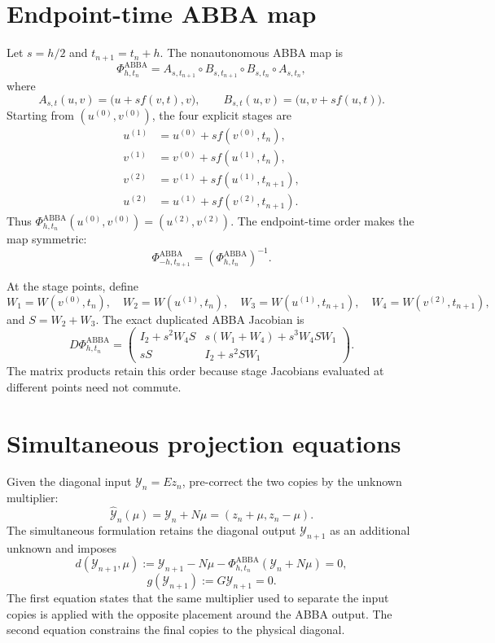 \documentclass[11pt,a4paper]{article}
\newcommand{\Id}{I}
\newcommand{\Y}{\mathcal{Y}}
\newcommand{\PhiAB}{\Phi^{\mathrm{ABBA}}_{h,t_n}}
\begin{document}
\section{Endpoint-time ABBA map}

Let $s=h/2$ and $t_{n+1}=t_n+h$. The nonautonomous ABBA map is
\[
 \PhiAB
 =A_{s,t_{n+1}}\circ B_{s,t_{n+1}}
  \circ B_{s,t_n}\circ A_{s,t_n},
\]
where
\[
 A_{s,t}(u,v)=\bigl(u+s f(v,t),v\bigr),
 \qquad
 B_{s,t}(u,v)=\bigl(u,v+s f(u,t)\bigr).
\]
Starting from $(u^{(0)},v^{(0)})$, the four explicit stages are
\begin{align*}
 u^{(1)}&=u^{(0)}+s f(v^{(0)},t_n),\\
 v^{(1)}&=v^{(0)}+s f(u^{(1)},t_n),\\
 v^{(2)}&=v^{(1)}+s f(u^{(1)},t_{n+1}),\\
 u^{(2)}&=u^{(1)}+s f(v^{(2)},t_{n+1}).
\end{align*}
Thus $\PhiAB(u^{(0)},v^{(0)})=(u^{(2)},v^{(2)})$.
The endpoint-time order makes the map symmetric:
\[
 \Phi^{\mathrm{ABBA}}_{-h,t_{n+1}}
 =\left(\Phi^{\mathrm{ABBA}}_{h,t_n}\right)^{-1}.
\]

At the stage points, define
\[
 W_1=W(v^{(0)},t_n),\quad
 W_2=W(u^{(1)},t_n),\quad
 W_3=W(u^{(1)},t_{n+1}),\quad
 W_4=W(v^{(2)},t_{n+1}),
\]
and $S=W_2+W_3$. The exact duplicated ABBA Jacobian is
\[
 D\PhiAB=
 \begin{pmatrix}
  \Id_2+s^2W_4S
  &s(W_1+W_4)+s^3W_4SW_1\\[2mm]
  sS
  &\Id_2+s^2SW_1
 \end{pmatrix}.
\]
The matrix products retain this order because stage Jacobians evaluated at
different points need not commute.

\section{Simultaneous projection equations}

Given the diagonal input $\Y_n=Ez_n$, pre-correct the two copies by the
unknown multiplier:
\[
 \widehat{\Y}_n(\mu)=\Y_n+N\mu=(z_n+\mu,z_n-\mu).
\]
The simultaneous formulation retains the diagonal output $\Y_{n+1}$ as an additional
unknown and imposes
\[
 d(\Y_{n+1},\mu)
 :=\Y_{n+1}-N\mu
   -\PhiAB(\Y_n+N\mu)=0,
\]
\[
 g(\Y_{n+1}):=G\Y_{n+1}=0.
\]
The first equation states that the same multiplier used to separate the input
copies is applied with the opposite placement around the ABBA output. The second
equation constrains the final copies to the physical diagonal.
\end{document}
